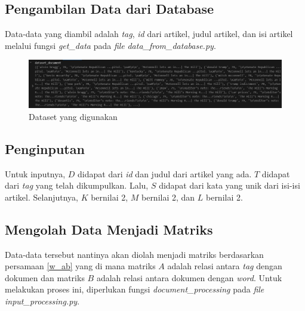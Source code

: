 \subsection{Pengambilan Data dari Database}

Data-data yang diambil adalah \emph{tag}, \emph{id} dari artikel, 
judul artikel, dan isi artikel melalui fungsi \emph{get\_data} 
pada \emph{file} \emph{data\_from\_database.py}.


\begin{figure}[H]
  \centering
  \includegraphics[width=1\textwidth]{gambar/bab_4_image/pengambilan data.jpg}
  \caption{Dataset yang digunakan}
  \label{gambar:pengambilanData}
\end{figure}

\subsection{Penginputan}

Untuk inputnya, $D$ didapat dari \textit{id} dan judul dari artikel yang ada. 
$T$ didapat dari \textit{tag} yang telah dikumpulkan. 
Lalu, $S$ didapat dari kata yang unik dari isi-isi artikel.
Selanjutnya, $K$ bernilai 2, $M$ bernilai 2, dan $L$ bernilai 2. 

\subsection{Mengolah Data Menjadi Matriks}

Data-data tersebut nantinya akan diolah menjadi matriks berdasarkan persamaan \ref{w_ab} 
yang di mana matriks $A$ adalah relasi antara \emph{tag} dengan dokumen dan 
matriks $B$ adalah relasi antara dokumen dengan \emph{word}. 
Untuk melakukan proses ini, diperlukan fungsi \emph{document\_processing} 
pada \textit{file} \textit{input\_processing.py}.

